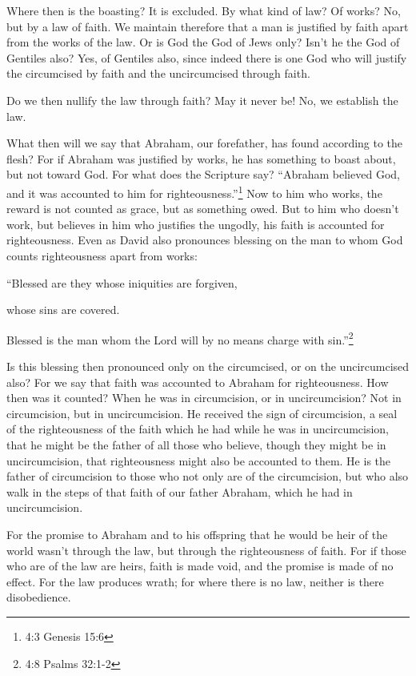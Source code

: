 \myverse{}Where then is the boasting? It is excluded. By what kind of law?
Of works? No, but by a law of faith.
\myverse{}We maintain therefore that a man is justified by faith apart from the works
of the law.
\myverse{}Or is God the God of Jews only? Isn’t he the God of Gentiles also? Yes, of
Gentiles also,
\myverse{}since indeed there is one God who will justify the circumcised by faith and
the uncircumcised through faith.

\myverse{}Do we then nullify the law through faith? May it never be! No,
we establish the law.


\mychapter{} \myverse*{}What then will we say that Abraham, our forefather, has found according
to the flesh?
\myverse{}For if Abraham was justified by works, he has something to boast about, but
not toward God.
\myverse{}For what does the Scripture say? “Abraham believed God, and it was accounted
to him for righteousness.”\footnote{4:3 Genesis 15:6}
\myverse{}Now to him who works, the reward is not counted as grace, but as something owed.
\myverse{}But to him who doesn’t work, but believes in him who justifies the ungodly,
his faith is accounted for righteousness.
\myverse{}Even as David also pronounces blessing on the man to whom God counts righteousness
apart from works:

\myverse{}“Blessed are they whose iniquities are forgiven,

whose sins are covered.

\myverse{}Blessed is the man whom the Lord will by no means charge with
sin.”\footnote{4:8 Psalms 32:1-2}

\myverse{}Is this blessing then pronounced only on the circumcised, or on
the uncircumcised also? For we say that faith was accounted to Abraham for righteousness.
\myverse{}How then was it counted? When he was in circumcision, or in uncircumcision?
Not in circumcision, but in uncircumcision.
\myverse{}He received the sign of circumcision, a seal of the righteousness of the faith
which he had while he was in uncircumcision, that he might be the father of all those who believe, though
they might be in uncircumcision, that righteousness might also be accounted to them.
\myverse{}He is the father of circumcision to those who not only are of the circumcision,
but who also walk in the steps of that faith of our father Abraham, which he had in uncircumcision.

\myverse{}For the promise to Abraham and to his offspring that he would
be heir of the world wasn’t through the law, but through the righteousness of faith.
\myverse{}For if those who are of the law are heirs, faith is made void, and the promise
is made of no effect.
\myverse{}For the law produces wrath; for where there is no law, neither is there disobedience.

